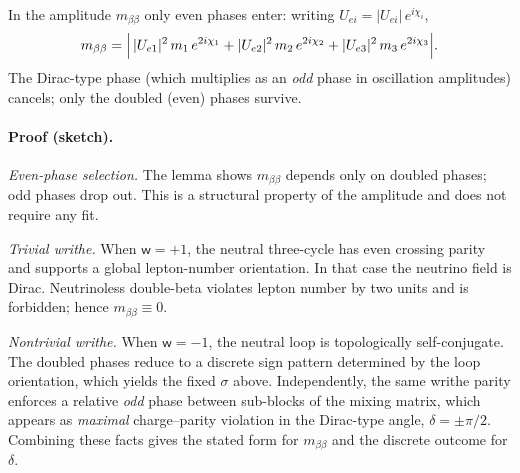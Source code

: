 \documentclass[11pt]{article}
\begin{document}
\begin{lemma}
In the amplitude $m_{\beta\beta}$ only even phases enter: writing $U_{ei}=|U_{ei}|\,e^{i\chi_i}$,
\[
m_{\beta\beta}=\Bigl|\,|U_{e1}|^2\,m_1\,e^{2i\chi_1}+|U_{e2}|^2\,m_2\,e^{2i\chi_2}+|U_{e3}|^2\,m_3\,e^{2i\chi_3}\Bigr|.
\]
The Dirac-type phase (which multiplies as an \emph{odd} phase in oscillation amplitudes) cancels; only the doubled (even) phases survive.
\end{lemma}

\medskip
\setlength{\fboxrule}{0.6pt}
\setlength{\fboxsep}{8pt}

\paragraph{Proof (sketch).}
\emph{Even-phase selection.} The lemma shows $m_{\beta\beta}$ depends only on doubled phases; odd phases drop out. This is a structural property of the amplitude and does not require any fit.

\emph{Trivial writhe.} When $\mathsf{w}=+1$, the neutral three-cycle has even crossing parity and supports a global lepton-number orientation. In that case the neutrino field is Dirac. Neutrinoless double-beta violates lepton number by two units and is forbidden; hence $m_{\beta\beta}\equiv 0$.

\emph{Nontrivial writhe.} When $\mathsf{w}=-1$, the neutral loop is topologically self-conjugate. The doubled phases reduce to a discrete sign pattern determined by the loop orientation, which yields the fixed $\sigma$ above. Independently, the same writhe parity enforces a relative \emph{odd} phase between sub-blocks of the mixing matrix, which appears as \emph{maximal} charge--parity violation in the Dirac-type angle, $\delta=\pm\pi/2$. Combining these facts gives the stated form for $m_{\beta\beta}$ and the discrete outcome for $\delta$.
\end{document}
